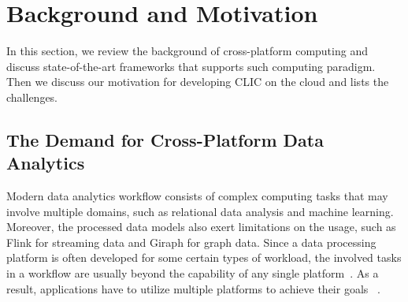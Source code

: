 
\section{Background and Motivation}



In this section, we review the background of cross-platform computing and discuss state-of-the-art frameworks that supports such computing paradigm. Then we discuss our motivation for developing CLIC on the cloud and lists the challenges.

\subsection{The Demand for Cross-Platform Data Analytics}

Modern data analytics workflow consists of complex computing tasks that may involve multiple domains, such as relational data analysis and machine learning. 
Moreover, the processed data models also exert limitations on the usage, such as Flink for streaming data and Giraph for graph data.
Since a data processing platform is often developed for some certain types of workload, the involved tasks in a workflow are usually beyond the capability of any single platform~\cite{tsoumakos2013case, gadepally2015d4m}. 
As a result, applications have to utilize multiple platforms to achieve their goals ~\cite{wang2017myria, lu2019multi, tan2017enabling}.




